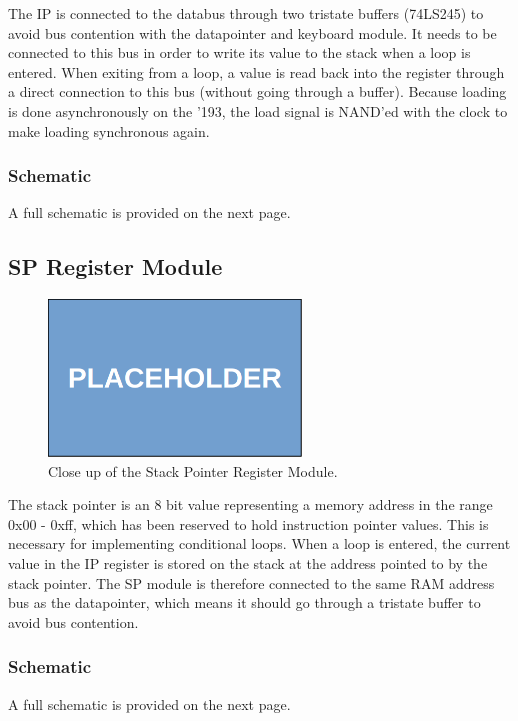 The IP is connected to the databus through two tristate buffers (74LS245) to avoid bus contention with the datapointer and keyboard module. It needs to be connected to this bus in order to write its value to the stack when a loop is entered. When exiting from a loop, a value is read back into the register through a direct connection to this bus (without going through a buffer). Because loading is done asynchronously on the '193, the load signal is NAND'ed with the clock to make loading synchronous again.

\subsubsection{Schematic}
A full schematic is provided on the next page.



\subsection{SP Register Module}
\begin{figure}[H]
  \centering
  \includegraphics[width=0.6\textwidth]{img/placeholder}
  \caption{Close up of the Stack Pointer Register Module.}
  \label{fig:spregcloseup}
\end{figure}

The stack pointer is an 8 bit value representing a memory address in the range 0x00 - 0xff, which has been reserved to hold instruction pointer values. This is necessary for implementing conditional loops. When a loop is entered, the current value in the IP register is stored on the stack at the address pointed to by the stack pointer. The SP module is therefore connected to the same RAM address bus as the datapointer, which means it should go through a tristate buffer to avoid bus contention.


\subsubsection{Schematic}
A full schematic is provided on the next page.



